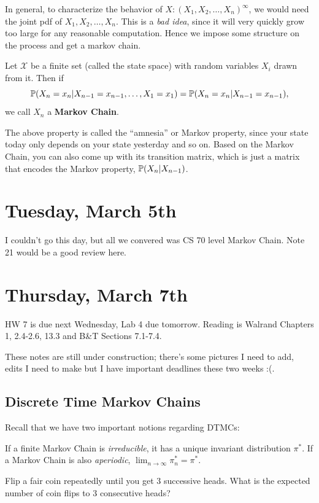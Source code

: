 \documentclass[11 pt]{scrartcl}
\begin{document}
In general, to characterize the behavior of $X: (X_1, X_2, \dots, X_n)^\infty$, we would need the joint pdf of $X_1, X_2, \dots, X_n$. This is a \emph{bad idea}, since it will very quickly grow too large for any reasonable computation. Hence we impose some structure on the process and get a markov chain. 

\begin{definition}
    Let $\mathcal{X}$ be a finite set (called the state space) with random variables $X_i$ drawn from it. Then if 
    \[ \mathbb P(X_n = x_n | X_{n-1} = x_{n-1}, \dots, X_1 = x_1) = \mathbb P(X_n = x_n | X_{n-1} = x_{n-1}),\] 
    we call $X_n$ a \textbf{Markov Chain}.
\end{definition}
The above property is called the ``amnesia'' or Markov property, since your state today only depends on your state yesterday and so on. 
Based on the Markov Chain, you can also come up with its transition matrix, which is just a matrix that encodes the Markov property, $\mathbb P(X_n | X_{n-1})$. 


\newpage
\section{Tuesday, March 5th}
I couldn't go this day, but all we convered was CS 70 level Markov Chain. Note 21 would be a good review here. 

\newpage
\section{Thursday, March 7th}
HW 7 is due next Wednesday, Lab 4 due tomorrow. Reading is Walrand Chapters 1, 2.4-2.6, 13.3 and B\&T Sections 7.1-7.4. 

These notes are still under construction; there's some pictures I need to add, edits I need to make but I have important deadlines these two weeks :(.

\subsection{Discrete Time Markov Chains}
Recall that we have two important notions regarding DTMCs: 
\begin{itemize}
    \ii If a finite Markov Chain is \emph{irreducible}, it has a unique invariant distribution $\pi^*$. 
    \ii If a Markov Chain is also \emph{aperiodic}, $\lim_{n\to\infty} \pi_n^* = \pi^*$. 
\end{itemize}

\begin{example}
    Flip a fair coin repeatedly until you get 3 successive heads. What is the expected number of coin flips to 3 consecutive heads?
\end{example}
\end{document}
